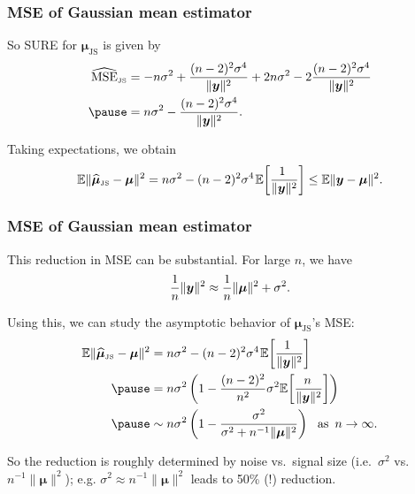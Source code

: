 \documentclass[18pt]{beamer}
\newcommand{\defineTightSpacing}{%
	\setlength{\abovedisplayskip}{.25\baselineskip}%
	\setlength{\belowdisplayskip}{.25\baselineskip}%
}
\renewcommand{\textsc}[1]{{\small \MakeUppercase{#1}}}
\newcommand{\thinnerspace}{\mskip.5\thinmuskip}
\newcommand{\expectation}{\mathbb{E}}
\newcommand{\js}[1]{\widehat{#1}_{\scriptscriptstyle \mathrm{JS}}}
\newcommand{\by}{\bm{y}}
\newcommand{\bmu}{\bm{\mu}}
\begin{document}
\begin{frame}
\frametitle{M{\normalsize SE} of Gaussian mean estimator}
So \textsc{SURE} for $\js{\bmu}$ is given by
\begin{equation*} \defineTightSpacing%
\begin{aligned}
\js{\operatorname{MSE}}
	&= - n \sigma^2 
		+ \frac{(n - 2)^2 \sigma^4}{\| \by \|^2}
		+ 2 n \sigma^2 
		- 2 \frac{(n - 2)^2 \sigma^4}{\| \by \|^2} \\
	\pause%
	&= n \sigma^2 - \frac{(n - 2)^2 \sigma^4}{\| \by \|^2}.
\end{aligned}
\end{equation*}
\pause%

Taking expectations, we obtain
\begin{equation*} \defineTightSpacing%
\expectation \| \js{\bmu} - \bmu \|^2 
	= n \sigma^2  - (n - 2)^2 \sigma^4 \thinnerspace \expectation\!\left[ \frac{\!\!1}{\| \by \|^2} \right] 
	\leq \expectation \| \by - \bmu \|^2.
\end{equation*}
\end{frame}

\begin{frame}
\frametitle{M{\normalsize SE} of Gaussian mean estimator}
This reduction in \textsc{MSE} can be substantial.
\pause%
For large $n$, we have
\begin{equation*} \defineTightSpacing%
\frac{1}{n} \| \by \|^2 \approx \frac{1}{n} \| \bmu \|^2 + \sigma^2.
\end{equation*}

\pause%
Using this, we can study the asymptotic behavior of $\js{\bmu}$'s \textsc{MSE}:
\begin{equation*} \defineTightSpacing%
\begin{aligned}
\expectation \| \js{\bmu} - \bmu \|^2 
	&= n \sigma^2  - (n - 2)^2 \sigma^4 \thinnerspace \expectation\!\left[ \frac{\!\!1}{\| \by \|^2} \right] \\
	\pause%
	&= n \sigma^2 \left(
		1 - \frac{(n - 2)^2}{n^2} \sigma^2 \expectation\!\left[ \frac{\!n}{\| \by \|^2} \right] 
	\right) \\
	\pause%
	&\sim n \sigma^2 \left(
		1 - \frac{\sigma^2}{\sigma^2 + n^{-1} \| \bmu \|^2} 
	\right)
	\ \text{ as } \, n \to \infty.
\end{aligned}
\end{equation*}

\pause%
So the reduction is roughly determined by noise vs.\ signal size (i.e.\ $\sigma^2$ vs.\ $n^{-1} \| \bmu \|^2$);
e.g.  $\sigma^2 \approx n^{-1} \| \bmu \|^2$ leads to 50\% (!) reduction. 
\end{frame}
\end{document}
